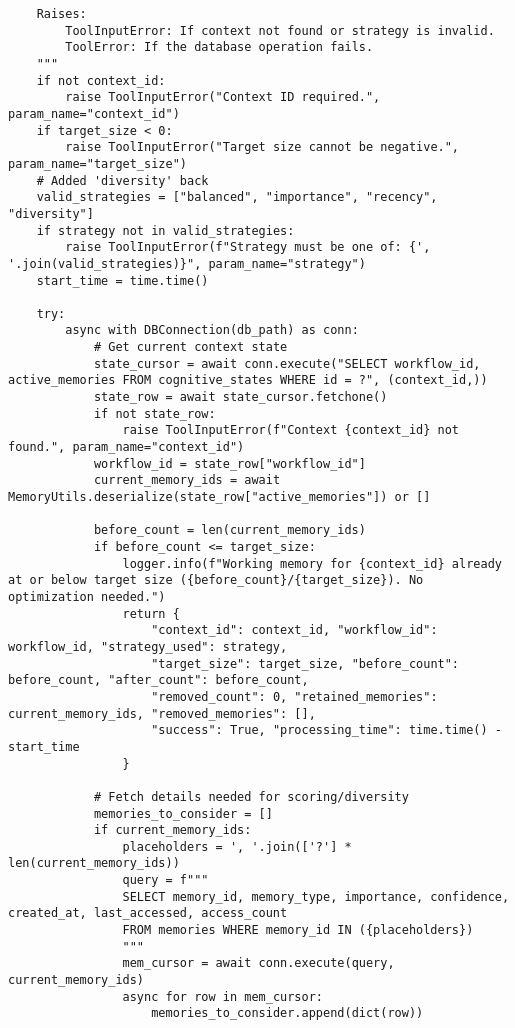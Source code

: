 \documentclass[12pt,a4paper]{article}
\begin{document}
\begin{pageablecode}
\begin{verbatim}
    Raises:
        ToolInputError: If context not found or strategy is invalid.
        ToolError: If the database operation fails.
    """
    if not context_id:
        raise ToolInputError("Context ID required.", param_name="context_id")
    if target_size < 0:
        raise ToolInputError("Target size cannot be negative.", param_name="target_size")
    # Added 'diversity' back
    valid_strategies = ["balanced", "importance", "recency", "diversity"]
    if strategy not in valid_strategies:
        raise ToolInputError(f"Strategy must be one of: {', '.join(valid_strategies)}", param_name="strategy")
    start_time = time.time()

    try:
        async with DBConnection(db_path) as conn:
            # Get current context state
            state_cursor = await conn.execute("SELECT workflow_id, active_memories FROM cognitive_states WHERE id = ?", (context_id,))
            state_row = await state_cursor.fetchone()
            if not state_row:
                raise ToolInputError(f"Context {context_id} not found.", param_name="context_id")
            workflow_id = state_row["workflow_id"]
            current_memory_ids = await MemoryUtils.deserialize(state_row["active_memories"]) or []

            before_count = len(current_memory_ids)
            if before_count <= target_size:
                logger.info(f"Working memory for {context_id} already at or below target size ({before_count}/{target_size}). No optimization needed.")
                return {
                    "context_id": context_id, "workflow_id": workflow_id, "strategy_used": strategy,
                    "target_size": target_size, "before_count": before_count, "after_count": before_count,
                    "removed_count": 0, "retained_memories": current_memory_ids, "removed_memories": [],
                    "success": True, "processing_time": time.time() - start_time
                }

            # Fetch details needed for scoring/diversity
            memories_to_consider = []
            if current_memory_ids:
                placeholders = ', '.join(['?'] * len(current_memory_ids))
                query = f"""
                SELECT memory_id, memory_type, importance, confidence, created_at, last_accessed, access_count
                FROM memories WHERE memory_id IN ({placeholders})
                """
                mem_cursor = await conn.execute(query, current_memory_ids)
                async for row in mem_cursor:
                    memories_to_consider.append(dict(row))


\end{verbatim}
\end{pageablecode}
\end{document}
